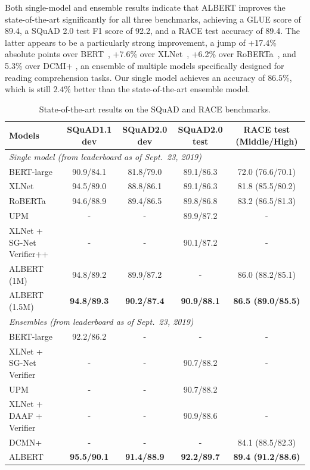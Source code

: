 Both single-model and ensemble results indicate that ALBERT improves the state-of-the-art significantly for all three benchmarks, achieving a GLUE score of 89.4, a SQuAD 2.0 test F1 score of 92.2, and a RACE test accuracy of 89.4. 
The latter appears to be a particularly strong improvement, a jump of +17.4\% absolute points over BERT~\citep{devlin2018bert,clark2019bam}, +7.6\% over XLNet~\citep{yang2019xlnet},  +6.2\% over RoBERTa~\citep{liu2019roberta}, and 5.3\% over DCMI+ \citep{zhang2019dcmn+}, an ensemble of multiple models specifically designed for reading comprehension tasks.
Our single model achieves an accuracy of $86.5\%$, which is still $2.4\%$ better than the state-of-the-art ensemble model. 



\begin{table}[!htbp] 
\setlength{\tabcolsep}{4pt}
\small
\centering
\begin{tabular}{ l   c c c c }
Models		&SQuAD1.1 dev	&SQuAD2.0 dev	& SQuAD2.0 test &RACE test (Middle/High) \\
\hline
\multicolumn{5}{l}{\textit{Single model (from leaderboard as of Sept.~23, 2019)}}\\
BERT-large          & 90.9/84.1 & 81.8/79.0 & 89.1/86.3 & 72.0 (76.6/70.1) \\
XLNet               & 94.5/89.0 & 88.8/86.1 & 89.1/86.3 & 81.8 (85.5/80.2) \\
RoBERTa             & 94.6/88.9 &89.4/86.5  & 89.8/86.8 & 83.2 (86.5/81.3) \\
UPM                 &  - & - & 89.9/87.2 & - \\
XLNet + SG-Net Verifier++ & - & - & 90.1/87.2 &  -\\
ALBERT (1M)          & 94.8/89.2 & 89.9/87.2 & - & 86.0 (88.2/85.1) \\
ALBERT (1.5M)        & \textbf{94.8/89.3}	& \textbf{90.2/87.4} & \textbf{90.9/88.1} & \textbf{86.5 (89.0/85.5)} \\
\hline
\multicolumn{5}{l}{\textit{Ensembles (from leaderboard as of Sept.~23, 2019)}}\\
BERT-large          & 92.2/86.2        & - & - &  - \\
XLNet + SG-Net Verifier & -& -& 	90.7/88.2	& -\\
UPM & - & - & 90.7/88.2 & \\ 
XLNet + DAAF + Verifier & - & - & 	90.9/88.6 & -\\
DCMN+               & - & -& - & 84.1 (88.5/82.3) \\
ALBERT     &    \textbf{95.5/90.1}      & \textbf{91.4/88.9} & \textbf{92.2/89.7}    &\textbf{89.4 (91.2/88.6)}  \\ 
\end{tabular}
\caption{State-of-the-art results on the SQuAD and RACE benchmarks. }
\label{table:sota-squad-race}
\vspace{-3pt}
\end{table}
	

